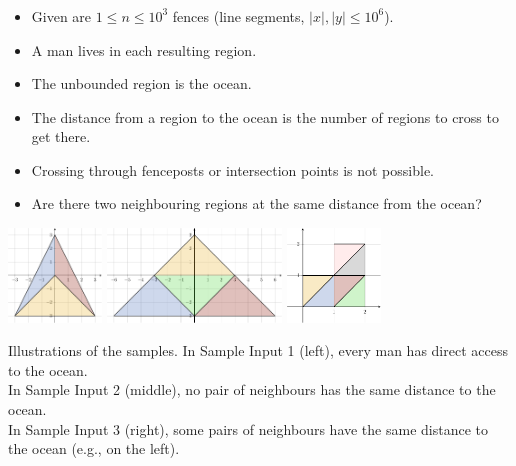 \begin{frame}
    \frametitle{\problemtitle}

    \begin{itemize}
        \item Given are $1 \leq n \leq 10^3$ fences (line segments, $\left|x\right|,\left|y\right|\leq10^6$).
        \item A man lives in each resulting region.
        \item The unbounded region is the ocean.
        \item The distance from a region to the ocean is the number of
        regions to cross to get there.
        \item Crossing through fenceposts or intersection points is not possible.
        \item Are there two neighbouring regions at the same distance
        from the ocean?
    \end{itemize}

    \vspace{1em}
    \centering
    \hfill
    \includegraphics[height=2.5cm]{sample1.pdf}
    \hfill
    \includegraphics[height=2.5cm]{sample2.pdf}
    \hfill
    \includegraphics[height=2.5cm]{sample3.pdf}
    \hfill

    \small
    Illustrations of the samples.
    In Sample Input 1 (left), every man has direct access to the ocean. \\
    In Sample Input 2 (middle), no pair of neighbours has the same distance to the ocean. \\
    In Sample Input 3 (right), some pairs of neighbours have the same distance to the ocean
    (e.g., on the left).
\end{frame}
